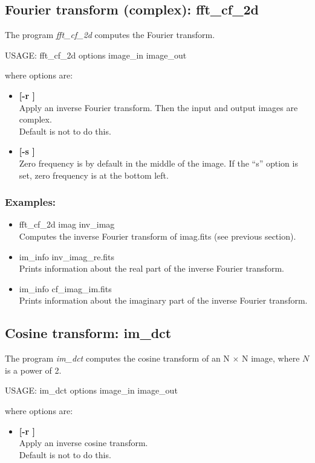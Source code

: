 \subsection{Fourier transform (complex): fft\_cf\_2d}
The program 
{\em fft\_cf\_2d} computes the Fourier transform.
{\bf
\begin{center}
USAGE: fft\_cf\_2d  options image\_in  image\_out  
\end{center}}
where options are:
\begin{itemize}
\item {\bf[-r ]} \\
Apply an inverse Fourier transform. Then the input and output
 images are complex. \\
Default is not to do this.
\item {\bf[-s ]} \\
 Zero frequency is by default in the middle of the image.
 If the ``s''  option is set, zero frequency is at the bottom left.
\end{itemize}
\subsubsection*{Examples:}
\begin{itemize}
\item  fft\_cf\_2d imag  inv\_imag \\
Computes the inverse Fourier transform of imag.fits 
(see previous section).
\item  im\_info inv\_imag\_re.fits \\
Prints information about the real part of the inverse Fourier transform.
\item  im\_info cf\_imag\_im.fits \\
Prints information about the imaginary part of the inverse Fourier transform.
\end{itemize}

\subsection{Cosine transform: im\_dct}
The program 
{\em im\_dct} computes the cosine transform of an N $\times$ N 
image, where $N$ is a
power of 2.
{\bf
\begin{center}
USAGE: im\_dct  options image\_in  image\_out  
\end{center}}
where options are:
\begin{itemize}
\item {\bf[-r ]} \\
Apply an inverse cosine transform. \\
Default is not to do this.
\end{itemize}
